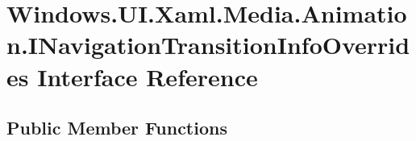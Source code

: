 \hypertarget{interface_windows_1_1_u_i_1_1_xaml_1_1_media_1_1_animation_1_1_i_navigation_transition_info_overrides}{}\section{Windows.\+U\+I.\+Xaml.\+Media.\+Animation.\+I\+Navigation\+Transition\+Info\+Overrides Interface Reference}
\label{interface_windows_1_1_u_i_1_1_xaml_1_1_media_1_1_animation_1_1_i_navigation_transition_info_overrides}
\subsection*{Public Member Functions}
